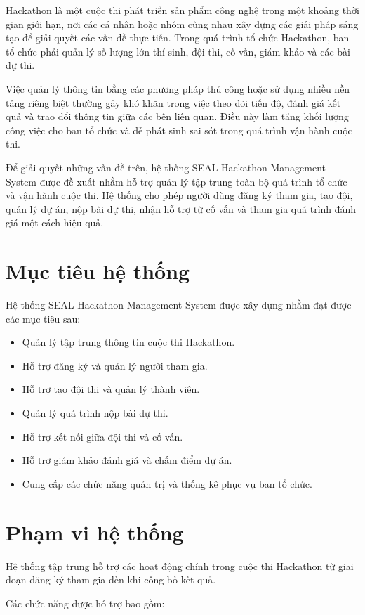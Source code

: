 Hackathon là một cuộc thi phát triển sản phẩm công nghệ trong một khoảng thời gian giới hạn, nơi các cá nhân hoặc nhóm cùng nhau xây dựng các giải pháp sáng tạo để giải quyết các vấn đề thực tiễn. Trong quá trình tổ chức Hackathon, ban tổ chức phải quản lý số lượng lớn thí sinh, đội thi, cố vấn, giám khảo và các bài dự thi.

Việc quản lý thông tin bằng các phương pháp thủ công hoặc sử dụng nhiều nền tảng riêng biệt thường gây khó khăn trong việc theo dõi tiến độ, đánh giá kết quả và trao đổi thông tin giữa các bên liên quan. Điều này làm tăng khối lượng công việc cho ban tổ chức và dễ phát sinh sai sót trong quá trình vận hành cuộc thi.

Để giải quyết những vấn đề trên, hệ thống SEAL Hackathon Management System được đề xuất nhằm hỗ trợ quản lý tập trung toàn bộ quá trình tổ chức và vận hành cuộc thi. Hệ thống cho phép người dùng đăng ký tham gia, tạo đội, quản lý dự án, nộp bài dự thi, nhận hỗ trợ từ cố vấn và tham gia quá trình đánh giá một cách hiệu quả.
	\section{Mục tiêu hệ thống}
	
	Hệ thống SEAL Hackathon Management System được xây dựng nhằm đạt được các mục tiêu sau:
	
	\begin{itemize}
		\item Quản lý tập trung thông tin cuộc thi Hackathon.
		\item Hỗ trợ đăng ký và quản lý người tham gia.
		\item Hỗ trợ tạo đội thi và quản lý thành viên.
		\item Quản lý quá trình nộp bài dự thi.
		\item Hỗ trợ kết nối giữa đội thi và cố vấn.
		\item Hỗ trợ giám khảo đánh giá và chấm điểm dự án.
		\item Cung cấp các chức năng quản trị và thống kê phục vụ ban tổ chức.
	\end{itemize}
	\section{Phạm vi hệ thống}
	
Hệ thống tập trung hỗ trợ các hoạt động chính trong cuộc thi Hackathon từ giai đoạn đăng ký tham gia đến khi công bố kết quả.

Các chức năng được hỗ trợ bao gồm:

